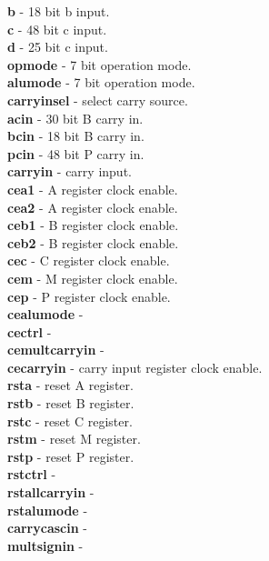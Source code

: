             {\bf b} - 18 bit b input.\\
            {\bf c} - 48 bit c input.\\
            {\bf d} - 25 bit c input.\\
            {\bf opmode} - 7 bit operation mode. \\
            {\bf alumode} - 7 bit operation mode. \\
            {\bf carryinsel} - select carry source. \\
            {\bf acin} - 30 bit B carry in. \\
            {\bf bcin} - 18 bit B carry in. \\
            {\bf pcin} - 48 bit P carry in. \\
            {\bf carryin} - carry input. \\            
            {\bf cea1} - A register clock enable. \\
            {\bf cea2} - A register clock enable. \\
            {\bf ceb1} - B register clock enable. \\
            {\bf ceb2} - B register clock enable. \\
            {\bf cec} - C register clock enable. \\
            {\bf cem} - M register clock enable. \\
            {\bf cep} - P register clock enable. \\
            {\bf cealumode} -  \\
            {\bf cectrl} -  \\
            {\bf cemultcarryin} -  \\
            {\bf cecarryin} - carry input register clock enable. \\
            {\bf rsta} - reset A register. \\
            {\bf rstb} - reset B register. \\
            {\bf rstc} - reset C register. \\
            {\bf rstm} - reset M register. \\
            {\bf rstp} - reset P register. \\
            {\bf rstctrl} -  \\
            {\bf rstallcarryin} -  \\
            {\bf rstalumode} -  \\
            {\bf carrycascin} -  \\
            {\bf multsignin} -    \\       

